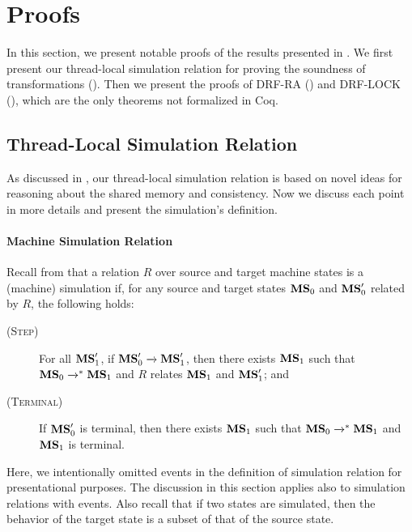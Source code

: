 \section{Proofs}
\label{sec:relaxed:proofs}

In this section, we present notable proofs of the results presented in .  We first
present our thread-local simulation relation for proving the soundness of transformations
().  Then we present the proofs of DRF-RA
() and DRF-LOCK (), which are the
only theorems not formalized in Coq.


\subsection{Thread-Local Simulation Relation}
\label{sec:relaxed:proofs:simulation}

As discussed in , our thread-local simulation relation is based on novel
ideas for reasoning about the shared memory and consistency.  Now we discuss each point in more
details and present the simulation's definition.


\paragraph{Machine Simulation Relation}

Recall from  that a relation $R$ over source and target machine
states is a (machine) simulation if, for any source and target states ${\mathbf{MS}}_0$ and ${\mathbf{MS}}'_0$
related by $R$, the following holds:
\begin{description}
\item[\textsc{(Step)}] For all ${\mathbf{MS}}'_1$, if ${\mathbf{MS}}'_0 \xrightarrow{} {\mathbf{MS}}'_1$, then there exists
  ${\mathbf{MS}}_1$ such that ${\mathbf{MS}}_0 \xrightarrow{}^* {\mathbf{MS}}_1$ and $R$ relates ${\mathbf{MS}}_1$ and ${\mathbf{MS}}'_1$;
  and
\item[\textsc{(Terminal)}] If ${\mathbf{MS}}'_0$ is terminal, then there exists ${\mathbf{MS}}_1$ such that
  ${\mathbf{MS}}_0 \xrightarrow{}^* {\mathbf{MS}}_1$ and ${\mathbf{MS}}_1$ is terminal.
\end{description}
%
Here, we intentionally omitted events in the definition of simulation relation for presentational
purposes.  The discussion in this section applies also to simulation relations with events.  Also
recall that if two states are simulated, then the behavior of the target state is a subset of that
of the source state.


